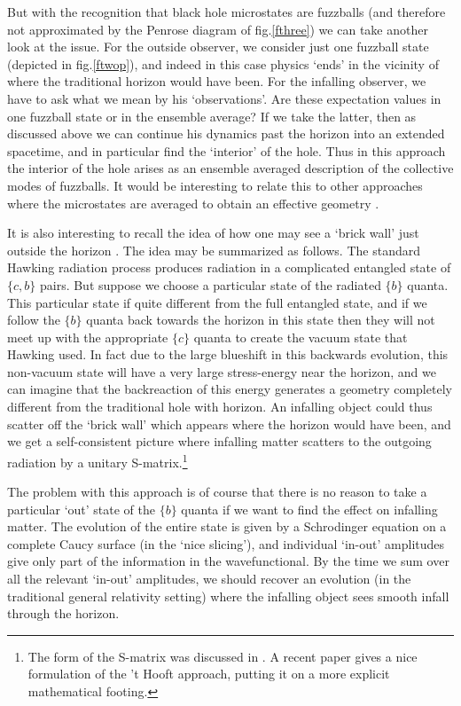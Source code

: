 \documentclass[12pt]{article}
\begin{document}
But with the recognition that black hole microstates are fuzzballs (and therefore not approximated by the Penrose diagram of fig.\ref{fthree}) we can take another look at the issue. For the outside observer, we consider just one fuzzball state (depicted in fig.\ref{ftwop}), and indeed in this case physics `ends' in the vicinity of where the traditional horizon would have been.  For the infalling observer, we have to ask what we mean by his `observations'. Are these expectation values in one fuzzball state or in the ensemble average? If we take the latter, then as discussed above we can continue his dynamics past the horizon into an extended spacetime, and in particular find  the `interior' of the hole. Thus in this approach the interior of the hole arises as an ensemble averaged description of the collective modes of fuzzballs. It would be interesting to relate this to other approaches where the microstates are averaged to obtain an effective geometry \cite{bala}. 

It is also interesting to recall the idea of how one may see a `brick wall' just outside the horizon  \cite{thooft1}. The idea may be summarized as follows.  The standard Hawking radiation process produces radiation in a complicated entangled state of $\{ c, b\}$ pairs. But suppose we choose a particular state of the radiated $\{ b\} $ quanta. This particular state if quite different from the full entangled state, and if we follow the $\{ b\}$ quanta back towards the horizon in this state then they will not meet up with the appropriate $\{ c\}$ quanta to create the vacuum state that Hawking used. In fact due to the large blueshift in this backwards evolution, this non-vacuum state will have a very large stress-energy near the horizon, and we can imagine that the backreaction of this energy generates a geometry completely different from the traditional hole with horizon. An infalling object could thus scatter off the `brick wall'  which appears where the horizon would have been, and we  get a self-consistent picture where infalling matter scatters to the outgoing radiation by a unitary S-matrix.\footnote{The form of the S-matrix was discussed in \cite{thooft1,vv}. A recent paper \cite{englert} gives a nice formulation of the 't Hooft approach, putting it on a more explicit mathematical footing.}

The problem with this approach is of course that there is no reason to take a particular `out' state of the $\{ b\}$ quanta if we want to find the effect on infalling matter. The evolution of the entire state is given by a Schrodinger equation on a complete Caucy surface (in the `nice slicing'), and individual `in-out' amplitudes give only part of the information in the wavefunctional. By the time we sum over all the relevant `in-out' amplitudes, we should recover an evolution (in the traditional general relativity setting) where the infalling object sees smooth infall through the horizon.
\end{document}
